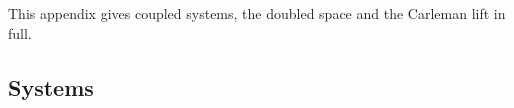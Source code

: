 %

This appendix gives coupled systems, the doubled space and the Carleman lift in full.

\subsection{Systems}
\label{app:systems}

